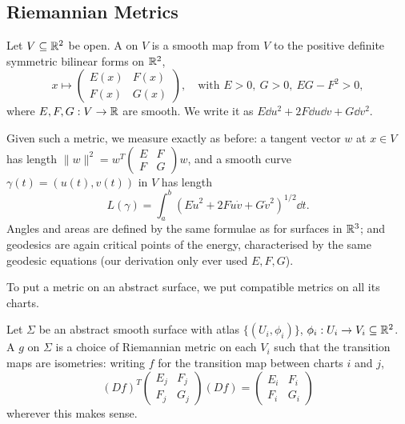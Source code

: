 \documentclass[a4paper]{scrartcl}
\begin{document}
\subsection{Riemannian Metrics}

\begin{definition}
    Let $V \subseteq \mathbb{R}^2$ be open. A  on $V$ is a smooth map from $V$ to the positive definite symmetric bilinear forms on $\mathbb{R}^2$,
    $$
    x \mapsto \begin{pmatrix} E(x) & F(x) \\ F(x) & G(x) \end{pmatrix}, \quad \text{with } E > 0,\ G > 0,\ EG - F^2 > 0,
    $$
    where $E, F, G: V \rightarrow \mathbb{R}$ are smooth. We write it as $E \dd u^2 + 2F \dd u \dd v + G \dd v^2$.
\end{definition}

Given such a metric, we measure exactly as before: a tangent vector $w$ at $x \in V$ has length
$\|w\|^2 = w^T \left(\begin{smallmatrix} E & F \\ F & G\end{smallmatrix}\right) w$, and a smooth curve $\gamma(t) = (u(t), v(t))$ in $V$ has length
$$
L(\gamma) = \int_a^b \left(E \dot u^2 + 2F \dot u \dot v + G \dot v^2\right)^{1/2} \dd t.
$$
Angles and areas are defined by the same formulae as for surfaces in $\mathbb{R}^3$; and geodesics are again critical points of the energy, characterised by the same geodesic equations (our derivation only ever used $E, F, G$).

To put a metric on an abstract surface, we put compatible metrics on all its charts.

\begin{definition}
    Let $\Sigma$ be an abstract smooth surface with atlas $\{(U_i, \phi_i)\}$, $\phi_i: U_i \rightarrow V_i \subseteq \mathbb{R}^2$. A  $g$ on $\Sigma$ is a choice of Riemannian metric on each $V_i$ such that the transition maps are isometries: writing $f$ for the transition map between charts $i$ and $j$,
    $$
    (Df)^T \begin{pmatrix} E_j & F_j \\ F_j & G_j\end{pmatrix} (Df) = \begin{pmatrix} E_i & F_i \\ F_i & G_i \end{pmatrix}
    $$
    wherever this makes sense.
\end{definition}
\end{document}
